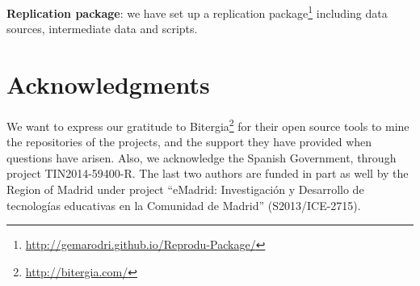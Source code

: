 \documentclass[10pt, conference]{IEEEtran}
\begin{document}

\textbf{Replication package}: we have set up a replication package\footnote{\url{http://gemarodri.github.io/Reprodu-Package/}} including data sources, intermediate data and scripts.


\section*{Acknowledgments}

We want to express our gratitude to Bitergia\footnote{\url{http://bitergia.com/}} for their open source tools to mine the repositories of the projects, and the support they have provided when questions have arisen. Also, we acknowledge the Spanish Government, through project TIN2014-59400-R. The last two authors are funded in part as well by the Region of Madrid under project ``eMadrid: Investigaci\'on y Desarrollo de tecnolog\'ias educativas en la Comunidad de Madrid'' (S2013/ICE-2715).



%
%
%




 


\end{document}
